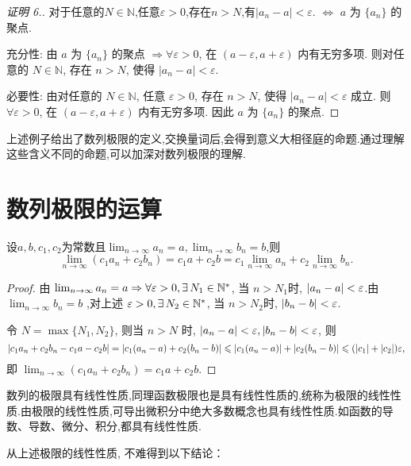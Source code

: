 \begin{proof}
    [证明 6.] 对于任意的$N\in \mathbb{N}$,任意$\varepsilon>0$,存在$n>N$,有$|a_n-a|<\varepsilon$. $\Leftrightarrow$ $a$ 为 $\{a_n\}$ 的聚点.

    充分性: 由 $a$ 为 $\{a_n\}$ 的聚点 $\Rightarrow \forall \varepsilon > 0$, 在 $(a - \varepsilon, a + \varepsilon)$ 内有无穷多项. 则对任意的 $N \in \mathbb{N}$, 存在 $n > N$, 使得 $|a_n - a| < \varepsilon$.

    必要性: 由对任意的 $N \in \mathbb{N}$, 任意 $\varepsilon > 0$, 存在 $n > N$, 使得 $|a_n - a| < \varepsilon$ 成立. 则 $\forall \varepsilon > 0$, 在 $(a - \varepsilon, a + \varepsilon)$ 内有无穷多项. 因此 $a$ 为 $\{a_n\}$ 的聚点.
\end{proof}

上述例子给出了数列极限的定义,交换量词后,会得到意义大相径庭的命题.通过理解这些含义不同的命题,可以加深对数列极限的理解.

\section{数列极限的运算}

\begin{theorem}[数列极限的线性性质]
    设$a,b,c_1,c_2$为常数且$\lim_{n \to \infty} a_n = a, \lim_{n \to \infty} b_n=b$,则 $$\lim_{n \to \infty}(c_1 a_n+c_2b_n)=c_1a+c_2b =c_1 \lim_{n \to \infty} a_n+c_2 \lim_{n \to \infty} b_n . $$
\end{theorem}

\begin{proof}
    由 $\lim_{n \to \infty} a_n = a \Rightarrow \forall \ve > 0 , \exists N_1 \in \mathbb{N}^*$, 当 $n > N_1 $时, $ |a_n - a| < \varepsilon $.由 $\lim_{n \to \infty} b_n = b$ ,对上述 $\ve >0 , \exists N_2 \in \mathbb{N}^*$, 当 $n > N_2 $时, $ |b_n - b| < \varepsilon $.

    令 $N = \max\{N_1,N_2\}$, 则当 $n > N$ 时, $ |a_n - a| < \varepsilon, |b_n - b| < \varepsilon $, 则 $$ |c_1a_n + c_2b_n - c_1a - c_2b| = |c_1(a_n - a) + c_2(b_n - b)| \leqslant |c_1(a_n - a)| + |c_2(b_n - b)| \leqslant ( |c_1| + |c_2| ) \varepsilon , $$ 即 $\lim_{n \to \infty} (c_1a_n + c_2b_n) = c_1a + c_2b$.
\end{proof}

数列的极限具有线性性质,同理函数极限也是具有线性性质的,统称为极限的线性性质.由极限的线性性质,可导出微积分中绝大多数概念也具有线性性质.如函数的导数、导数、微分、积分,都具有线性性质.

从上述极限的线性性质, 不难得到以下结论：

